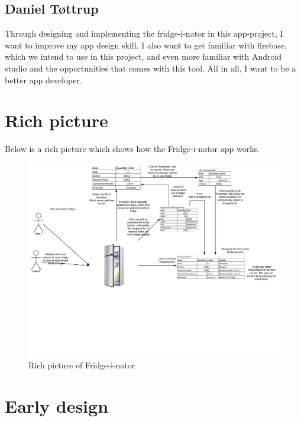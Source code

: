 \documentclass[12pt]{article}
\begin{document}
\subsection{Daniel Tøttrup}
Through designing and implementing the fridge-i-nator in this app-project, I want to improve my app design skill. I also want to get familiar
with firebase, which we intend to use in this project, and even more familiar with
Android studio and the opportunities that comes with this tool. All in all, I want to be a better app developer.

\section{Rich picture}
Below is a rich picture which shows how the Fridge-i-nator app works.

\begin{figure}[H]
	\centering
	\includegraphics[width=180mm]{Img/Fridge_rich_picture.pdf}
	\caption{Rich picture of Fridge-i-nator}
	\label{fig:RichPic}
\end{figure}

\section{Early design}
\end{document}
